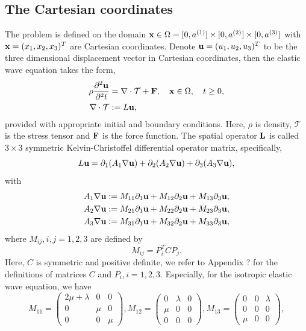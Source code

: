 \documentclass[a4paper]{article}
\begin{document}
\subsection{The Cartesian coordinates}
The problem is defined on the domain ${\bf x}\in\Omega = [0,a^{(1)}]\times[0,a^{(2)}]\times[0,a^{(3)}]$ with ${\bf x} = (x_1,x_2,x_3)^T$ are Cartesian coordinates. Denote ${\bf u} = (u_1,u_2,u_3)^T$ to be the three dimensional displacement vector in Cartesian coordinates, then the elastic wave equation takes the form,
\begin{align*}
    \rho\frac{\partial^2{\bf u}}{\partial^2 t} &= \nabla\cdot\mathcal{T} + {\bf F}, \ \ \ {\bf x}\in\Omega,\ \ \ t\geq 0,\\
    \nabla\cdot\mathcal{T} &:= L{\bf u},
\end{align*}
provided with appropriate initial and boundary conditions. Here, $\rho$ is density, $\mathcal{T}$ is the stress tensor and ${\bf F}$ is the force function. The spatial operator ${\bf L}$ is called $3\times3$ symmetric Kelvin-Christoffel differential operator matrix, specifically,
\begin{equation*}
    L{\bf  u} = \partial_1(A_1\nabla{\bf u}) + \partial_2(A_2\nabla{\bf u}) + \partial_3(A_3\nabla{\bf u}),
\end{equation*}
with
\begin{align*}
A_1\nabla{\bf u} &:= M_{11}\partial_1{\bf u} + M_{12}\partial_2{\bf u} + M_{13}\partial_3{\bf u}, \\
A_2\nabla{\bf u} &:= M_{21}\partial_1{\bf u} + M_{22}\partial_2{\bf u} + M_{23}\partial_3{\bf u}, \\
A_3\nabla{\bf u} &:= M_{31}\partial_1{\bf u} + M_{32}\partial_2{\bf u} + M_{33}\partial_3{\bf u},
\end{align*}
where $M_{ij}, i,j = 1,2,3$ are defined by
\begin{equation*}
M_{ij} = P^T_iCP_j.
\end{equation*}
Here, $C$ is symmetric and positive definite, we refer to Appendix ? for the definitions of matrices $C$ and $P_i, i = 1,2,3$. Especially, for the isotropic elastic wave equation, we have
\[ M_{11} = \left(\begin{array}{ccc}
2\mu+\lambda & 0 & 0\\
0 & \mu & 0\\
0 & 0 & \mu\end{array}\right), M_{12} = \left(\begin{array}{ccc}
0 & \lambda & 0\\
\mu & 0 & 0\\
0 & 0 & 0\end{array}\right), M_{13} = \left(\begin{array}{ccc}
0 & 0 & \lambda\\
0 & 0 & 0\\
\mu & 0 & 0\end{array}\right),\]
\end{document}
